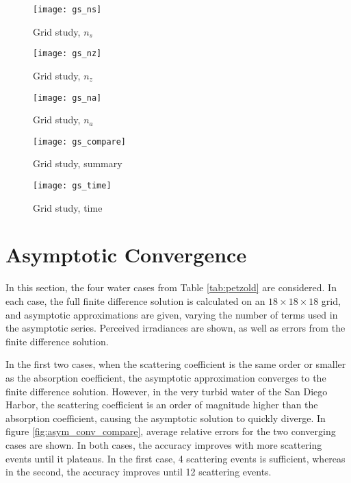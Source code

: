 \begin{figure}[h]
  \centering
  \texttt{[image: gs\_ns]}
  \caption{Grid study, $n_s$}
  \label{fig:gs_ns}
\end{figure}

\begin{figure}[h]
  \centering
  \texttt{[image: gs\_nz]}
  \caption{Grid study, $n_z$}
  \label{fig:gs_nz}
\end{figure}

\begin{figure}[h]
  \centering
  \texttt{[image: gs\_na]}
  \caption{Grid study, $n_a$}
  \label{fig:gs_na}
\end{figure}

\begin{figure}[h]
  \centering
  \texttt{[image: gs\_compare]}
  \caption{Grid study, summary}
  \label{fig:gs_compare}
\end{figure}


\begin{figure}[h]
  \centering
  \texttt{[image: gs\_time]}
  \caption{Grid study, time}
  \label{fig:gs_compare}
\end{figure}


\section{Asymptotic Convergence}
\label{sec:asym_conv}

In this section, the four water cases from Table \ref{tab:petzold} are considered.
In each case, the full finite difference solution is calculated on an $18 \times 18 \times 18$ grid,
and asymptotic approximations are given, varying the number of terms used in the asymptotic series.
Perceived irradiances are shown, as well as errors from the finite difference solution.

In the first two cases, when the scattering coefficient is the same order or smaller as the absorption coefficient,
the asymptotic approximation converges to the finite difference solution.
However, in the very turbid water of the San Diego Harbor, the scattering coefficient is an order of magnitude higher
than the absorption coefficient, causing the asymptotic solution to quickly diverge.
In figure \ref{fig:asym_conv_compare}, average relative errors for the two converging cases are shown.
In both cases, the accuracy improves with more scattering events until it plateaus.
In the first case, 4 scattering events is sufficient, whereas in the second, the accuracy improves until 12 scattering events.

